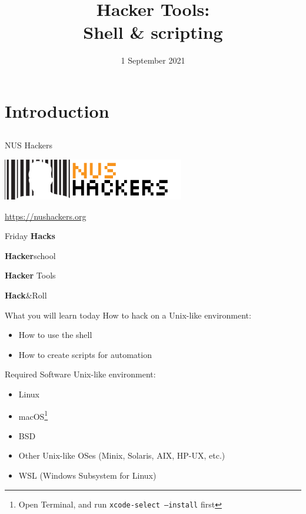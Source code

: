 \documentclass[12pt]{beamer}
\title{Hacker Tools: \\Shell \& scripting}
\date{1 September 2021}
\begin{document}
\frame[plain]{\titlepage}

\section{Introduction}
\subsection{}

\begin{frame}{NUS Hackers}

  \begin{center}
    \includegraphics[width=0.5\linewidth]{../NUSHackers}

    \url{https://nushackers.org}
  \end{center}

  \begin{center}
    Friday \textbf{Hacks}
    
    \textbf{Hacker}school

    \textbf{Hacker} Tools
    
    \textbf{Hack}\&Roll
  \end{center}

\end{frame}

\begin{frame}{What you will learn today}
  How to hack on a Unix-like environment:
  \begin{itemize}
    \item How to use the shell
    \item How to create scripts for automation
  \end{itemize}
\end{frame}

\begin{frame}{Required Software}
  Unix-like environment:
  \begin{itemize}
    \item Linux
    \item macOS\footnote{Open Terminal, and run \texttt{xcode-select --install} first}
    \item BSD
    \item Other Unix-like OSes (Minix, Solaris, AIX, HP-UX, etc.)
    \item WSL (Windows Subsystem for Linux)
  \end{itemize}
\end{frame}
\end{document}
